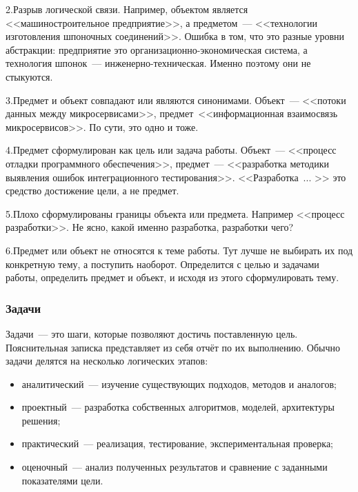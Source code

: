 2.\hspace{0.7ex}Разрыв логической связи. Например, объектом является <<машиностроительное предприятие>>, а предметом~--- <<технологии изготовления шпоночных соединений>>. Ошибка в том, что это разные уровни абстракции: предприятие это организационно-экономическая система, а технология шпонок~--- инженерно-техническая. Именно поэтому они не стыкуются.

3.\hspace{0.7ex}Предмет и объект совпадают или являются синонимами. Объект~--- <<потоки данных между микросервисами>>, предмет~<<информационная взаимосвязь микросервисов>>. По сути, это одно и тоже.

4.\hspace{0.7ex}Предмет сформулирован как цель или задача работы. Объект~--- <<процесс отладки программного обеспечения>>, предмет~--- <<разработка методики выявления ошибок интеграционного тестирования>>. <<Разработка~... >>  это средство достижение цели, а не предмет.

5.\hspace{0.7ex}Плохо сформулированы границы объекта или предмета. Например <<процесс разработки>>. Не ясно, какой именно разработка, разработки чего?

6.\hspace{0.7ex}Предмет или объект не относятся к теме работы. Тут лучше не выбирать их под конкретную тему, а поступить наоборот. Определится с целью и задачами работы, определить предмет и объект, и исходя из этого сформулировать тему.



\subsubsection{Задачи}

Задачи~--- это шаги, которые позволяют достичь поставленную цель. Пояснительная записка представляет из себя отчёт по их выполнению. Обычно задачи делятся на несколько логических этапов:

\begin{itemize}
	\item  аналитический~--- изучение существующих подходов, методов и аналогов;
	\item  проектный~--- разработка собственных алгоритмов, моделей, архитектуры решения;
	\item  практический~--- реализация, тестирование, экспериментальная проверка;
	\item  оценочный~--- анализ полученных результатов и сравнение с заданными показателями цели.
\end{itemize}


